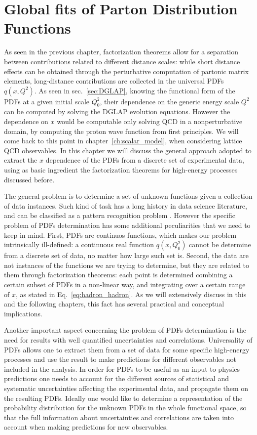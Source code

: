 \chapter{Global fits of Parton Distribution Functions} 
\label{ch:nnpdf_methodology}
As seen in the previous chapter, factorization theorems allow for a separation between contributions 
related to different distance scales: while short distance
effects can be obtained through the perturbative computation of partonic matrix elements, 
long-distance contributions are collected in the universal PDFs $q\left(x,Q^2\right)$. As seen in sec.~\ref{sec:DGLAP},
knowing the functional form of the PDFs at a given initial scale $Q_0^2$, 
their dependence on the generic energy scale $Q^2$ can be computed by solving the DGLAP evolution equations.
However the dependence on $x$ would be computable only solving QCD in a nonperturbative domain, 
by computing the proton wave function from first principles. We will come back to 
this point in chapter~\ref{ch:scalar_model}, when considering lattice QCD observables.
In this chapter we will discuss the general approach adopted to extract the $x$ dependence of the PDFs
from a discrete set of experimental data, using as basic ingredient the factorization theorems for high-energy processes
discussed before.

%
The general problem is to determine a set of unknown functions given
a collection of data instances. Such kind of task has a long history in data science literature, 
and can be classified as a pattern recognition problem \cite{Forte:2020yip}.
However the specific problem of PDFs determination has some additional peculiarities that we need to keep in mind.
First, PDFs are continuos functions, which makes our problem intrinsically ill-defined: a continuous real function
$q\left(x,Q_0^2\right)$ cannot be determine from a discrete set of data, no matter how large such set is.
Second, the data are not instances of the functions we are trying to determine, but they are related to 
them through factorization theorems: each point is determined combining a certain subset of PDFs in a non-linear way,
and integrating over a certain range of $x$, as stated in Eq.~\eqref{eq:hadron_hadron}. 
As we will extensively discuss in this and the following chapters,
this fact has several practical and conceptual implications.

%
Another important aspect concerning the problem of PDFs determination 
is the need for results with well quantified uncertainties and correlations.
Universality of PDFs allows one to extract them from a set of data for some specific high-energy processes
and use the result to make predictions for different observables not included in the analysis.
In order for PDFs to be useful as an input to physics predictions one needs to account for the different
sources of statistical and systematic uncertainties affecting the experimental data, and
propagate them on the resulting PDFs.
Ideally one would like to determine a representation 
of the probability distribution for the unknown PDFs in the whole functional space, so that the full information
about uncertainties and correlations are taken into account when making predictions for new observables.

